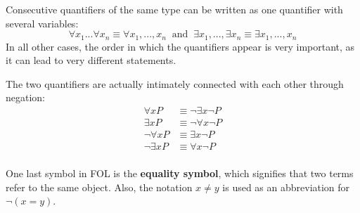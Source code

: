 \documentclass{article}
\begin{document}
Consecutive quantifiers of the same type can be written as one quantifier with several variables:
\[\forall x_1 ... \forall x_n \equiv \forall x_1,...,x_n \;\;\text{and}\;\; \exists x_1, ..., \exists x_n \equiv \exists x_1,...,x_n\]
In all other cases, the order in which the quantifiers appear is very important, as it can lead to very different statements.

The two quantifiers are actually intimately connected with each other through negation:
\begin{align*}
    \forall x P & \equiv \neg\exists x \neg P \\
    \exists x P & \equiv \neg\forall x \neg P \\
    \neg\forall x P & \equiv \exists x \neg P \\
    \neg\exists x P & \equiv \forall x \neg P \\
\end{align*}

One last symbol in FOL is the \textbf{equality symbol}, which signifies that two terms refer to the same object. Also, the notation \(x\neq y\) is used as an abbreviation for \(\neg(x=y)\).
\end{document}
